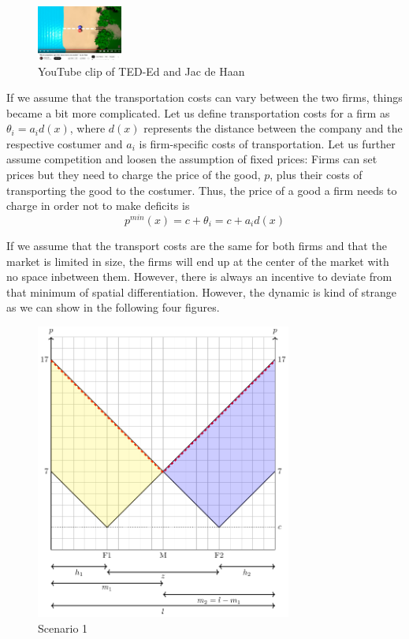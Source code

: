 \documentclass[
  12pt,
  oneside]{book}
\theoremstyle{definition}
\theoremstyle{definition}
\theoremstyle{definition}
\theoremstyle{definition}
\theoremstyle{remark}
\begin{document}
\begin{figure}
\centering
\includegraphics[width=0.25\textwidth,height=\textheight]{fig/hotelling.png}
\caption[\label{fig:hotelling} YouTube clip of TED-Ed and Jac de Haan]{\label{fig:hotelling} YouTube clip of TED-Ed and Jac de Haan\footnotemark{}}
\end{figure}

If we assume that the transportation costs can vary between the two firms, things became a bit more complicated. Let us define transportation costs for a firm as \(\theta_i=a_i d(x)\), where \(d(x)\) represents the distance between the company and the respective costumer and \(a_i\) is firm-specific costs of transportation. Let us further assume competition and loosen the assumption of fixed prices: Firms can set prices but they need to charge the price of the good, \(p\), plus their costs of transporting the good to the costumer. Thus, the price of a good a firm needs to charge in order not to make deficits is
\[
p^{min}(x)=c+\theta_i=c+a_i d(x)
\]

If we assume that the transport costs are the same for both firms and that the market is limited in size, the firms will end up at the center of the market with no space inbetween them. However, there is always an incentive to deviate from that minimum of spatial differentiation. However, the dynamic is kind of strange as we can show in the following four figures.

\begin{figure}
\centering
\includegraphics[width=0.75\textwidth,height=\textheight]{fig/lau1.png}
\caption{\label{fig:lau1} Scenario 1}
\end{figure}
\end{document}
